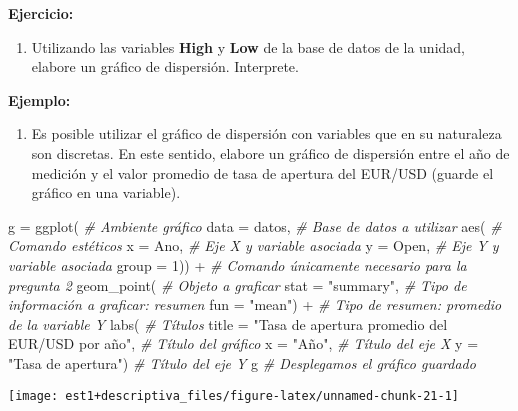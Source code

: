 \documentclass[
]{book}
\newenvironment{Shaded}{\begin{snugshade}}{\end{snugshade}}
\newcommand{\AttributeTok}[1]{\textcolor[rgb]{0.77,0.63,0.00}{#1}}
\newcommand{\CommentTok}[1]{\textcolor[rgb]{0.56,0.35,0.01}{\textit{#1}}}
\newcommand{\DecValTok}[1]{\textcolor[rgb]{0.00,0.00,0.81}{#1}}
\newcommand{\FunctionTok}[1]{\textcolor[rgb]{0.00,0.00,0.00}{#1}}
\newcommand{\NormalTok}[1]{#1}
\newcommand{\OtherTok}[1]{\textcolor[rgb]{0.56,0.35,0.01}{#1}}
\newcommand{\SpecialCharTok}[1]{\textcolor[rgb]{0.00,0.00,0.00}{#1}}
\newcommand{\StringTok}[1]{\textcolor[rgb]{0.31,0.60,0.02}{#1}}
\providecommand{\tightlist}{%
  \setlength{\itemsep}{0pt}\setlength{\parskip}{0pt}}
\begin{document}
\textbf{Ejercicio:}

\begin{enumerate}
\def\labelenumi{\arabic{enumi}.}
\tightlist
\item
  Utilizando las variables \textbf{High} y \textbf{Low} de la base de datos de la unidad, elabore un gráfico de dispersión. Interprete.
\end{enumerate}

\textbf{Ejemplo:}

\begin{enumerate}
\def\labelenumi{\arabic{enumi}.}
\tightlist
\item
  Es posible utilizar el gráfico de dispersión con variables que en su naturaleza son discretas. En este sentido, elabore un gráfico de dispersión entre el año de medición y el valor promedio de tasa de apertura del EUR/USD (guarde el gráfico en una variable).
\end{enumerate}

\begin{Shaded}
\begin{Highlighting}[]
\NormalTok{g }\OtherTok{=} \FunctionTok{ggplot}\NormalTok{( }\CommentTok{\# Ambiente gráfico}
  \AttributeTok{data =}\NormalTok{ datos, }\CommentTok{\# Base de datos a utilizar}
  \FunctionTok{aes}\NormalTok{( }\CommentTok{\# Comando estéticos}
    \AttributeTok{x =}\NormalTok{ Ano, }\CommentTok{\# Eje X y variable asociada}
    \AttributeTok{y =}\NormalTok{ Open, }\CommentTok{\# Eje Y y variable asociada}
    \AttributeTok{group =} \DecValTok{1}\NormalTok{)) }\SpecialCharTok{+} \CommentTok{\# Comando únicamente necesario para la pregunta 2}
  \FunctionTok{geom\_point}\NormalTok{( }\CommentTok{\# Objeto a graficar}
    \AttributeTok{stat =} \StringTok{"summary"}\NormalTok{, }\CommentTok{\# Tipo de información a graficar: resumen}
    \AttributeTok{fun =} \StringTok{"mean"}\NormalTok{) }\SpecialCharTok{+} \CommentTok{\# Tipo de resumen: promedio de la variable Y}
  \FunctionTok{labs}\NormalTok{( }\CommentTok{\# Títulos}
    \AttributeTok{title =} \StringTok{"Tasa de apertura promedio del EUR/USD por año"}\NormalTok{, }\CommentTok{\# Título del gráfico}
    \AttributeTok{x =} \StringTok{"Año"}\NormalTok{, }\CommentTok{\# Título del eje X}
    \AttributeTok{y =} \StringTok{"Tasa de apertura"}\NormalTok{) }\CommentTok{\# Título del eje Y}
\NormalTok{g }\CommentTok{\# Desplegamos el gráfico guardado}
\end{Highlighting}
\end{Shaded}

\begin{center}\texttt{[image: est1+descriptiva\_files/figure-latex/unnamed-chunk-21-1]} \end{center}
\end{document}
